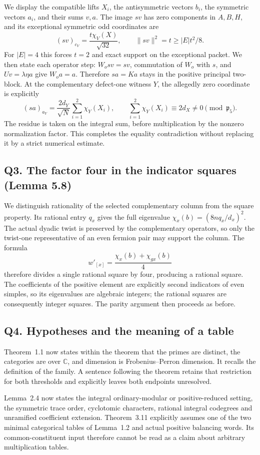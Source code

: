 \documentclass[11pt,a4paper]{article}
\newcommand{\issue}[1]{\subsection*{#1}}
\begin{document}
We display the compatible lifts $X_i$, the antisymmetric vectors $b_i$, the symmetric vectors $a_i$, and their sums $v,a$. The image $sv$ has zero components in $A,B,H$, and its exceptional symmetric odd coordinates are
\[
 (sv)_{c_V}=\frac{t\chi_V(X)}{\sqrt{32}},\qquad
 \|sv\|^2=t\ge |E|t^2/8.
\]
For $|E|=4$ this forces $t=2$ and exact support on the exceptional packet. We then state each operator step: $W_o sv=sv$, commutation of $W_o$ with $s$, and $Uv=\lambda\eta a$ give $W_oa=a$. Therefore $sa=Ka$ stays in the positive principal two-block. At the complementary defect-one witness $Y$, the allegedly zero coordinate is explicitly
\[
 (sa)_{a_Y}=\frac{2d_Y}{\sqrt N}\sum_{i=1}^2\chi_Y(X_i),
 \qquad \sum_{i=1}^2\chi_Y(X_i)\equiv2d_X\ne0\pmod{\mathfrak p_5}.
\]
The residue is taken on the integral sum, before multiplication by the nonzero normalization factor. This completes the equality contradiction without replacing it by a strict numerical estimate.

\issue{Q3. The factor four in the indicator squares (Lemma 5.8)}
We distinguish rationality of the selected complementary column from the square property. Its rational entry $q_x$ gives the full eigenvalue
$\chi_x(b)=(8nq_x/d_x)^2$. The actual dyadic twist is preserved by the complementary operators, so only the twist-one representative of an even fermion pair may support the column. The formula
\[
 w'_{[x]}=\frac{\chi_x(b)+\chi_{gx}(b)}4
\]
therefore divides a single rational square by four, producing a rational square. The coefficients of the positive element are explicitly second indicators of even simples, so its eigenvalues are algebraic integers; the rational squares are consequently integer squares. The parity argument then proceeds as before.

\issue{Q4. Hypotheses and the meaning of a table}
Theorem~1.1 now states within the theorem that the primes are distinct, the categories are over $\mathbb C$, and dimension is Frobenius--Perron dimension. It recalls the definition of the family. A sentence following the theorem retains that restriction for both thresholds and explicitly leaves both endpoints unresolved.

Lemma~2.4 now states the integral ordinary-modular or positive-reduced setting, the symmetric trace order, cyclotomic characters, rational integral codegrees and unramified coefficient extension. Theorem~3.11 explicitly assumes one of the two minimal categorical tables of Lemma~1.2 and actual positive balancing words. Its common-constituent input therefore cannot be read as a claim about arbitrary multiplication tables.
\end{document}
